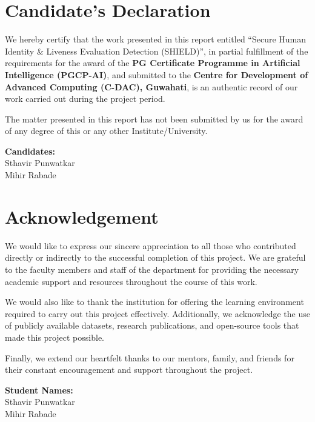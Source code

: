 \documentclass[12pt, a4paper]{report}
\begin{document}
\chapter*{Candidate's Declaration}
We hereby certify that the work presented in this report entitled ``Secure Human Identity \& Liveness Evaluation Detection (SHIELD)'', in partial fulfillment of the requirements for the award of the \textbf{PG Certificate Programme in Artificial Intelligence (PGCP-AI)}, and submitted to the \textbf{Centre for Development of Advanced Computing (C-DAC), Guwahati}, is an authentic record of our work carried out during the project period.

The matter presented in this report has not been submitted by us for the award of any degree of this or any other Institute/University.

\vspace{2cm}
\noindent \textbf{Candidates:} \\
\vspace{0.3cm}
Sthavir Punwatkar \\
\vspace{0.5cm}
Mihir Rabade

\chapter*{Acknowledgement}
We would like to express our sincere appreciation to all those who contributed directly or indirectly to the successful completion of this project. We are grateful to the faculty members and staff of the department for providing the necessary academic support and resources throughout the course of this work.

We would also like to thank the institution for offering the learning environment required to carry out this project effectively. Additionally, we acknowledge the use of publicly available datasets, research publications, and open-source tools that made this project possible.

Finally, we extend our heartfelt thanks to our mentors, family, and friends for their constant encouragement and support throughout the project.

\vspace{2cm}
\noindent \textbf{Student Names:} \\
\vspace{0.3cm}
Sthavir Punwatkar \\
\vspace{0.5cm}
Mihir Rabade
\end{document}

